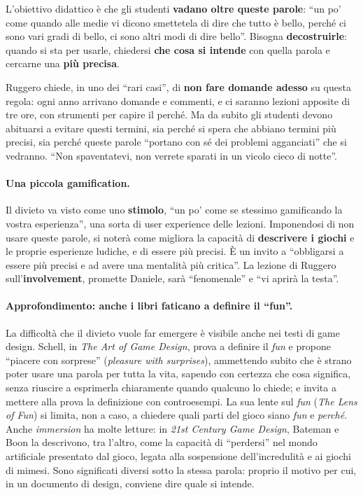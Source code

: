L'obiettivo didattico è che gli studenti \textbf{vadano oltre queste parole}:
``un po' come quando alle medie vi dicono smettetela di dire che tutto è bello,
perché ci sono vari gradi di bello, ci sono altri modi di dire bello''. Bisogna
\textbf{decostruirle}: quando si sta per usarle, chiedersi \textbf{che cosa si
intende} con quella parola e cercarne una \textbf{più precisa}.

Ruggero chiede, in uno dei ``rari casi'', di \textbf{non fare domande adesso} su
questa regola: ogni anno arrivano domande e commenti, e ci saranno lezioni
apposite di tre ore, con strumenti per capire il perché. Ma da subito gli
studenti devono abituarsi a evitare questi termini, sia perché si spera che
abbiano termini più precisi, sia perché queste parole ``portano con sé dei
problemi agganciati'' che si vedranno. ``Non spaventatevi, non verrete sparati in
un vicolo cieco di notte''.

\paragraph{Una piccola gamification.} Il divieto va visto come uno
\textbf{stimolo}, ``un po' come se stessimo gamificando la vostra esperienza'',
una sorta di user experience delle lezioni. Imponendosi di non usare queste
parole, si noterà come migliora la capacità di \textbf{descrivere i giochi} e le
proprie esperienze ludiche, e di essere più precisi. È un invito a ``obbligarsi a
essere più precisi e ad avere una mentalità più critica''. La lezione di
Ruggero sull'\textbf{involvement}, promette Daniele, sarà ``fenomenale'' e
``vi aprirà la testa''.

\paragraph{Approfondimento: anche i libri faticano a definire il ``fun''.} La
difficoltà che il divieto vuole far emergere è visibile anche nei testi di game
design. Schell, in \emph{The Art of Game Design}, prova a definire il \emph{fun}
e propone ``piacere con sorprese'' (\emph{pleasure with surprises}), ammettendo
subito che è strano poter usare una parola per tutta la vita, sapendo con
certezza che cosa significa, senza riuscire a esprimerla chiaramente quando
qualcuno lo chiede; e invita a mettere alla prova la definizione con
controesempi. La sua lente sul \emph{fun} (\emph{The Lens of Fun}) si limita,
non a caso, a chiedere quali parti del gioco siano \emph{fun} e \emph{perché}.
Anche \emph{immersion} ha molte letture: in \emph{21st Century Game Design},
Bateman e Boon la descrivono, tra l'altro, come la capacità di ``perdersi''
nel mondo artificiale presentato dal gioco, legata alla sospensione
dell'incredulità e ai giochi di mimesi. Sono significati diversi sotto la stessa
parola: proprio il motivo per cui, in un documento di design, conviene dire
quale si intende.

